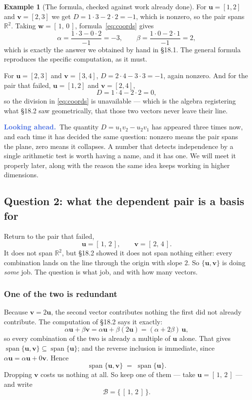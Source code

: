 \documentclass[11pt]{article}
\theoremstyle{definition}
\newtheorem{ex}{Example}[section]
\theoremstyle{remark}
\newcommand{\lookahead}{\par\smallskip\noindent
  \textbf{\sffamily\textcolor{RoyalBlue}{Looking ahead.}}\ \ignorespaces}
\newcommand{\R}{\mathbb{R}}
\newcommand{\vc}[1]{\mathbf{#1}}
\newcommand{\bas}{\mathcal{B}}
\DeclareMathOperator{\spanop}{span}   %
\begin{document}
\begin{ex}[The formula, checked against work already done]
For $\vc{u}=[1,2]$ and $\vc{v}=[2,3]$ we get $D = 1\cdot3 - 2\cdot2 = -1$, which
is nonzero, so the pair spans $\R^{2}$. Taking $\vc{w}=[\,1,\,0\,]$,
formula~\eqref{eq:coords} gives
\[
  \alpha = \frac{1\cdot3 - 0\cdot2}{-1} = -3,
  \qquad
  \beta  = \frac{1\cdot0 - 2\cdot1}{-1} = 2 ,
\]
which is exactly the answer we obtained by hand in \S18.1. The general formula
reproduces the specific computation, as it must.

For $\vc{u}=[2,3]$ and $\vc{v}=[3,4]$, $D = 2\cdot4 - 3\cdot3 = -1$, again
nonzero. And for the pair that failed, $\vc{u}=[1,2]$ and $\vc{v}=[2,4]$,
\[
  D = 1\cdot4 - 2\cdot2 = 0 ,
\]
so the division in \eqref{eq:coords} is unavailable --- which is the algebra
registering what \S18.2 saw geometrically, that those two vectors never leave
their line.
\end{ex}

\lookahead The quantity $D=u_1v_2-u_2v_1$ has appeared three times now, and each
time it has decided the same question: nonzero means the pair spans the plane,
zero means it collapses. A number that detects independence by a single
arithmetic test is worth having a name, and it has one. We will meet it properly
later, along with the reason the same idea keeps working in higher dimensions.

\subsection{Question 2: what the dependent pair is a basis for}
Return to the pair that failed,
\[
  \vc{u}=[\,1,\,2\,],
  \qquad
  \vc{v}=[\,2,\,4\,] .
\]
It does not span $\R^{2}$, but \S18.2 showed it does not span nothing either:
every combination lands on the line through the origin with slope $2$. So
$\{\vc{u},\vc{v}\}$ is doing \emph{some} job. The question is what job, and with
how many vectors.

\subsubsection*{One of the two is redundant}
Because $\vc{v}=2\vc{u}$, the second vector contributes nothing the first did not
already contribute. The computation of \S18.2 says it exactly:
\[
  \alpha\vc{u} + \beta\vc{v}
  = \alpha\vc{u} + \beta(2\vc{u})
  = (\alpha+2\beta)\,\vc{u} ,
\]
so every combination of the two is already a multiple of $\vc{u}$ alone. That
gives $\spanop\{\vc{u},\vc{v}\}\subseteq\spanop\{\vc{u}\}$; and the reverse
inclusion is immediate, since $\alpha\vc{u}=\alpha\vc{u}+0\vc{v}$. Hence
\[
  \spanop\{\vc{u},\vc{v}\} \;=\; \spanop\{\vc{u}\} .
\]
Dropping $\vc{v}$ costs us nothing at all. So keep one of them --- take
$\vc{u}=[\,1,\,2\,]$ --- and write
\[
  \bas = \bigl\{\,[\,1,\,2\,]\,\bigr\} .
\]
\end{document}
